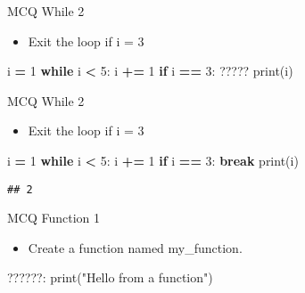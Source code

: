 \documentclass[
  8pt,
  ignorenonframetext,
]{beamer}
\newenvironment{Shaded}{\begin{snugshade}}{\end{snugshade}}
\newcommand{\BuiltInTok}[1]{#1}
\newcommand{\ControlFlowTok}[1]{\textcolor[rgb]{0.13,0.29,0.53}{\textbf{#1}}}
\newcommand{\DecValTok}[1]{\textcolor[rgb]{0.00,0.00,0.81}{#1}}
\newcommand{\NormalTok}[1]{#1}
\newcommand{\OperatorTok}[1]{\textcolor[rgb]{0.81,0.36,0.00}{\textbf{#1}}}
\newcommand{\StringTok}[1]{\textcolor[rgb]{0.31,0.60,0.02}{#1}}
\providecommand{\tightlist}{%
  \setlength{\itemsep}{0pt}\setlength{\parskip}{0pt}}
\begin{document}
\begin{frame}[fragile]{MCQ While 2}
\protect\hypertarget{mcq-while-2}{}
\begin{itemize}
\tightlist
\item
  Exit the loop if i = 3
\end{itemize}

\begin{Shaded}
\begin{Highlighting}[]
\NormalTok{i }\OperatorTok{=} \DecValTok{1}
\ControlFlowTok{while}\NormalTok{ i }\OperatorTok{\textless{}} \DecValTok{5}\NormalTok{:}
\NormalTok{  i }\OperatorTok{+=} \DecValTok{1}
  \ControlFlowTok{if}\NormalTok{ i }\OperatorTok{==} \DecValTok{3}\NormalTok{:}
\NormalTok{    ?????}
  \BuiltInTok{print}\NormalTok{(i)}
\end{Highlighting}
\end{Shaded}
\end{frame}

\begin{frame}[fragile]{MCQ While 2}
\protect\hypertarget{mcq-while-2-1}{}
\begin{itemize}
\tightlist
\item
  Exit the loop if i = 3
\end{itemize}

\begin{Shaded}
\begin{Highlighting}[]
\NormalTok{i }\OperatorTok{=} \DecValTok{1}
\ControlFlowTok{while}\NormalTok{ i }\OperatorTok{\textless{}} \DecValTok{5}\NormalTok{:}
\NormalTok{  i }\OperatorTok{+=} \DecValTok{1}
  \ControlFlowTok{if}\NormalTok{ i }\OperatorTok{==} \DecValTok{3}\NormalTok{:}
    \ControlFlowTok{break}
  \BuiltInTok{print}\NormalTok{(i)}
\end{Highlighting}
\end{Shaded}

\begin{verbatim}
## 2
\end{verbatim}
\end{frame}

\begin{frame}[fragile]{MCQ Function 1}
\protect\hypertarget{mcq-function-1}{}
\begin{itemize}
\tightlist
\item
  Create a function named my\_function.
\end{itemize}

\begin{Shaded}
\begin{Highlighting}[]
\NormalTok{??????:}
  \BuiltInTok{print}\NormalTok{(}\StringTok{"Hello from a function"}\NormalTok{)}
\end{Highlighting}
\end{Shaded}
\end{frame}
\end{document}

